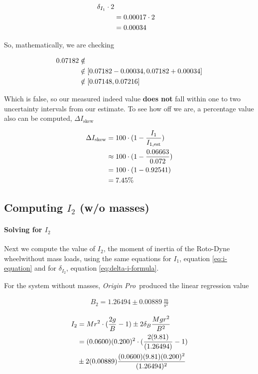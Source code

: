 \documentclass[coverpage]{article}
\newcommand{\softwareText}[1]{\textit{#1}\texttrademark}
\newcommand{\origin}{\softwareText{Origin Pro}}
\newcommand{\rwheel}{Roto-Dyne wheel}
\newcommand{\mpssq}{\frac{\text{m}}{\text{s}^2}}
\begin{document}
	\begin{align}
		\delta_{I_1} \cdot 2 \notag \\
		&= 0.00017 \cdot 2 \notag \\
		&= 0.00034 \notag
	\end{align}
	
	So, mathematically, we are checking
	
	\begin{align}
		0.07182 &\notin \notag \\
		&\notin [0.07182 - 0.00034, 0.07182 + 0.00034] \notag \\
		&\notin [0.07148, 0.07216]
	\end{align}

	\newcommand{\iSkew}{\Delta{I}_{\text{skew}}}

	Which is false, so our measured indeed value \textbf{does not} fall within one to two uncertainty intervals from our estimate. To see how off we are, a percentage value also can be computed, $\iSkew$
	
	\begin{align}
		\iSkew &= 100 \cdot (1 - \frac{I_1}{I_{1, \text{est}}}) \notag \\
		&\approx 100 \cdot (1 - \frac{0.06663}{0.072}) \notag \\
		&= 100 \cdot (1 - 0.92541) \notag \\
		&= 7.45\%
	\end{align}

	\subsection{Computing $I_2$ (w/o masses)}
	
	\paragraph{Solving for $I_2$}
	
	Next we compute the value of $I_2$, the moment of inertia of the \rwheel without mass loads, using the same equations for $I_1$, equation \ref{eq:i-equation} and for $\delta_{I_2}$, equation \ref{eq:delta-i-formula}.
	
	For the system without masses, \origin~produced the linear regression value
	
	\begin{align}
		B_2 = 1.26494 \pm 0.00889\ \mpssq \label{eq:def-b2}
	\end{align}
	
	\begin{align}
		I_2 &= Mr^2 \cdot (\frac{2g}{B} - 1) \pm 2 \delta_B \frac{M g r^2}{B^2} \notag \\
		&= (0.0600)(0.200)^2 \cdot (\frac{2(9.81)}{(1.26494)} - 1) \notag \\
		&\pm 2 (0.00889) \frac{(0.0600) (9.81) (0.200)^2}{(1.26494)^2} \notag
	\end{align}
\end{document}
